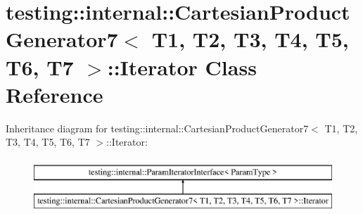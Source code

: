 \hypertarget{classtesting_1_1internal_1_1_cartesian_product_generator7_1_1_iterator}{}\section{testing\+:\+:internal\+:\+:Cartesian\+Product\+Generator7$<$ T1, T2, T3, T4, T5, T6, T7 $>$\+:\+:Iterator Class Reference}
\label{classtesting_1_1internal_1_1_cartesian_product_generator7_1_1_iterator}
Inheritance diagram for testing\+:\+:internal\+:\+:Cartesian\+Product\+Generator7$<$ T1, T2, T3, T4, T5, T6, T7 $>$\+:\+:Iterator\+:\begin{figure}[H]
\begin{center}
\leavevmode
\includegraphics[height=2.000000cm]{classtesting_1_1internal_1_1_cartesian_product_generator7_1_1_iterator}
\end{center}
\end{figure}
